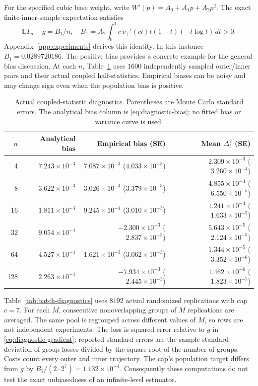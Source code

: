 \documentclass[11pt]{article}
\newcommand{\E}{\mathbb E}
\newcommand{\1}{\mathbf 1}
\theoremstyle{definition}
\begin{document}
For the specified cubic base weight, write $W'(p)=A_0+A_1p+A_2p^2$. The exact finite-inner-sample expectation satisfies
\begin{equation}\label{eq:diagnostic-bias}
 \E T_n-g=B_1/n,\quad
 B_1=A_2\int_0^1 c\,v_+'(ct)t(1-t)(-t\log t)\,dt>0.
\end{equation}
Appendix~\ref{app:experiments} derives this identity. In this instance $B_1=0.0289720186$. The positive bias provides a concrete example for the general bias discussion. At each $n$, Table~\ref{tab:level-diagnostics} uses $1600$ independently sampled outer/inner pairs and their actual coupled half-statistics. Empirical biases can be noisy and may change sign even when the population bias is positive.

\begin{table}[htbp]
\centering\small
\caption{Actual coupled-statistic diagnostics. Parentheses are Monte Carlo standard errors. The analytical bias column is \eqref{eq:diagnostic-bias}; no fitted bias or variance curve is used.}\label{tab:level-diagnostics}
\begin{tabular}{rrrr}
\toprule
$n$ & Analytical bias & Empirical bias (SE) & Mean $\Delta_\ell^2$ (SE)\\
\midrule
4 & $7.243\times10^{-3}$ & $7.087\times10^{-3}$ ($4.033\times10^{-3}$) & $2.309\times10^{-3}$ ($3.260\times10^{-4}$) \\
8 & $3.622\times10^{-3}$ & $3.026\times10^{-4}$ ($3.379\times10^{-3}$) & $4.855\times10^{-4}$ ($6.550\times10^{-5}$) \\
16 & $1.811\times10^{-3}$ & $9.245\times10^{-4}$ ($3.010\times10^{-3}$) & $1.241\times10^{-4}$ ($1.633\times10^{-5}$) \\
32 & $9.054\times10^{-4}$ & $-2.300\times10^{-3}$ ($2.837\times10^{-3}$) & $5.643\times10^{-5}$ ($2.124\times10^{-5}$) \\
64 & $4.527\times10^{-4}$ & $1.621\times10^{-3}$ ($3.062\times10^{-3}$) & $1.344\times10^{-5}$ ($3.352\times10^{-6}$) \\
128 & $2.263\times10^{-4}$ & $-7.934\times10^{-3}$ ($2.445\times10^{-3}$) & $1.462\times10^{-6}$ ($1.823\times10^{-7}$) \\
\bottomrule
\end{tabular}
\end{table}

Table~\ref{tab:batch-diagnostics} uses $8192$ actual randomized replications with cap $c=7$. For each $M$, consecutive nonoverlapping groups of $M$ replications are averaged. The same pool is regrouped across different values of $M$, so rows are not independent experiments. The loss is squared error relative to $g$ in \eqref{eq:diagnostic-gradient}; reported standard errors are the sample standard deviation of group losses divided by the square root of the number of groups. Costs count every outer and inner trajectory. The cap's population target differs from $g$ by $B_1/(2\cdot2^7)=1.132\times10^{-4}$. Consequently these computations do not test the exact unbiasedness of an infinite-level estimator.
\end{document}
